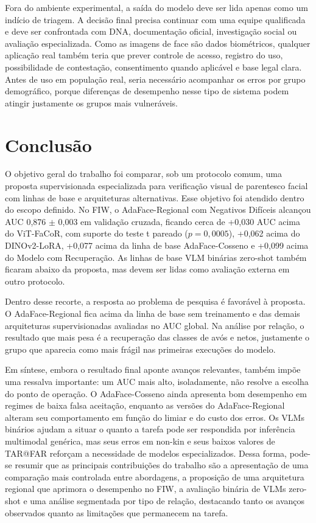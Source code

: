 Fora do ambiente experimental, a saída do modelo deve ser lida apenas como um indício de triagem. A decisão final precisa continuar com uma equipe qualificada e deve ser confrontada com DNA, documentação oficial, investigação social ou avaliação especializada. Como as imagens de face são dados biométricos, qualquer aplicação real também teria que prever controle de acesso, registro do uso, possibilidade de contestação, consentimento quando aplicável e base legal clara. Antes de uso em população real, seria necessário acompanhar os erros por grupo demográfico, porque diferenças de desempenho nesse tipo de sistema podem atingir justamente os grupos mais vulneráveis.

\section{Conclusão}

O objetivo geral do trabalho foi comparar, sob um protocolo comum, uma proposta supervisionada especializada para verificação visual de parentesco facial com linhas de base e arquiteturas alternativas. Esse objetivo foi atendido dentro do escopo definido. No FIW, o AdaFace-Regional com Negativos Difíceis alcançou AUC 0,876 $\pm$ 0,003 em validação cruzada, ficando cerca de +0,030 AUC acima do ViT-FaCoR, com suporte do teste t pareado ($p=0{,}0005$), +0,062 acima do DINOv2-LoRA, +0,077 acima da linha de base AdaFace-Cosseno e +0,099 acima do Modelo com Recuperação. As linhas de base VLM binárias zero-shot também ficaram abaixo da proposta, mas devem ser lidas como avaliação externa em outro protocolo.

Dentro desse recorte, a resposta ao problema de pesquisa é favorável à proposta. O AdaFace-Regional fica acima da linha de base sem treinamento e das demais arquiteturas supervisionadas avaliadas no AUC global. Na análise por relação, o resultado que mais pesa é a recuperação das classes de avós e netos, justamente o grupo que aparecia como mais frágil nas primeiras execuções do modelo.

Em síntese, embora o resultado final aponte avanços relevantes, também impõe uma ressalva importante: um AUC mais alto, isoladamente, não resolve a escolha do ponto de operação. O AdaFace-Cosseno ainda apresenta bom desempenho em regimes de baixa falsa aceitação, enquanto as versões do AdaFace-Regional alteram seu comportamento em função do limiar e do custo dos erros. Os VLMs binários ajudam a situar o quanto a tarefa pode ser respondida por inferência multimodal genérica, mas seus erros em non-kin e seus baixos valores de TAR@FAR reforçam a necessidade de modelos especializados. Dessa forma, pode-se resumir que as principais contribuições do trabalho são a apresentação de uma comparação mais controlada entre abordagens, a proposição de uma arquitetura regional que aprimora o desempenho no FIW, a avaliação binária de VLMs zero-shot e uma análise segmentada por tipo de relação, destacando tanto os avanços observados quanto as limitações que permanecem na tarefa.
